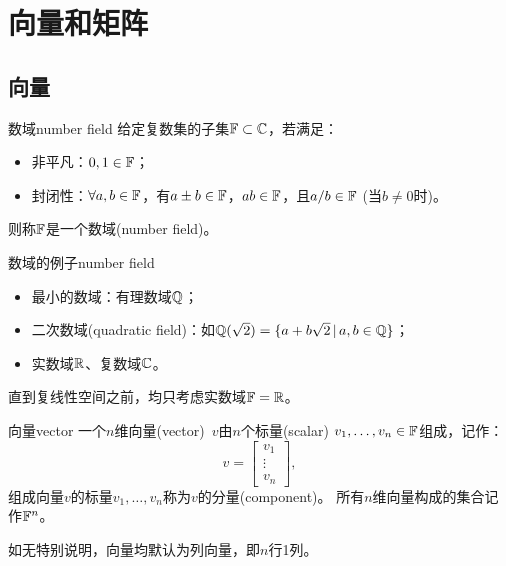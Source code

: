 \chapter{向量和矩阵}

\section{向量}

\begin{definition}
	{数域}{number field}
	给定复数集的子集$\mathbb{F} \subset \mathbb{C}$，若满足：
	\begin{itemize}
		\item 非平凡：$0,1 \in \mathbb{F}$；
		\item 封闭性：$\forall a,b \in \mathbb{F}$，有$a \pm b \in \mathbb{F}$，$ab \in \mathbb{F}$，且$a/b \in \mathbb{F}$ (当$b \neq 0$时)。
	\end{itemize}
	则称$\mathbb{F}$是一个数域(number field)。
\end{definition}

\begin{example}
	{数域的例子}{number field}
	\begin{itemize}
		\item 最小的数域：有理数域$\mathbb{Q}$；
	
		\item 二次数域(quadratic field)：如$\mathbb{Q}(\sqrt 2) = \{a + b\sqrt2\,\vert\,a,b \in \mathbb{Q}\}$；
	
		\item 实数域$\mathbb{R}$、复数域$\mathbb{C}$。
	\end{itemize}
\end{example}

\begin{remark}
	直到复线性空间之前，均只考虑实数域$\mathbb{F} = \mathbb{R}$。
\end{remark}

\begin{definition}{向量}{vector}
	一个$n$维向量(vector)~$v$由$n$个标量(scalar) $v_1,\ldots,v_n \in \mathbb{F}$组成，记作：
	\[
		v = \begin{bmatrix}
			v_1\\\vdots\\v_n
		\end{bmatrix},
	\]
	组成向量$v$的标量$v_1,\ldots,v_n$称为$v$的分量(component)。
	\tcblower
	所有$n$维向量构成的集合记作$\mathbb{F}^n$。
\end{definition}

\begin{remark}
	如无特别说明，向量均默认为列向量，即$n$行1列。
\end{remark}

